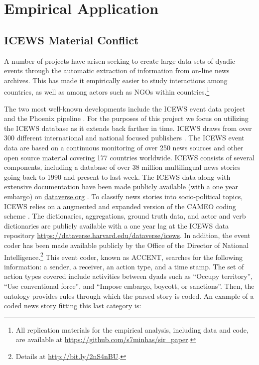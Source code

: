 \section*{\textbf{Empirical Application}}

\subsection*{ICEWS Material Conflict}

A number of projects have arisen seeking to create large data sets of dyadic events through the automatic extraction of information from on-line news archives. This has made it empirically easier to study interactions among countries, as well as among actors such as NGOs within countries.\footnote{All replication materials for the empirical analysis, including data and code, are available at \url{https://github.com/s7minhas/sir_paper}.}

The two most well-known developments include the ICEWS event data project \citep{icews:2015:data} and the Phoenix pipeline \citep{oeda:2016}. For the purposes of this project we focus on utilizing the ICEWS database as it extends back farther in time. ICEWS draws from over 300 different international and national focused publishers \citep{boschee:etal:2015}. The ICEWS event data are based on a continuous monitoring of over 250 news sources and other open source material covering 177 countries worldwide. ICEWS consists of several components, including a database of over 38 million multilingual news stories going back to 1990 and present to last week. The ICEWS data along with extensive documentation have been made publicly available (with a one year embargo) on \url{dataverse.org} \citep{icews:2015:aggregations,icews:2015:data}. To classify news stories into socio-political topics, ICEWS relies on a augmented and expanded version of the CAMEO coding scheme \citep{schrodt:etal:2009}. The dictionaries, aggregations, ground truth data, and actor and verb dictionaries are publicly  available with a one year lag at the ICEWS data repository \url{https://dataverse.harvard.edu/dataverse/icews}. In addition,  the event coder has been made available publicly by the Office of the Director of National Intelligence.\footnote{Details at \url{http://bit.ly/2nS4nBU}.} This event coder, known as ACCENT, searches for the following information: a sender, a receiver, an action type, and a time stamp. The set of action types covered include activities between dyads such as ``Occupy territory'', ``Use conventional force'', and ``Impose embargo, boycott, or sanctions''. Then, the ontology provides rules through which the parsed story is coded. An example of a coded news story fitting this last category is:

